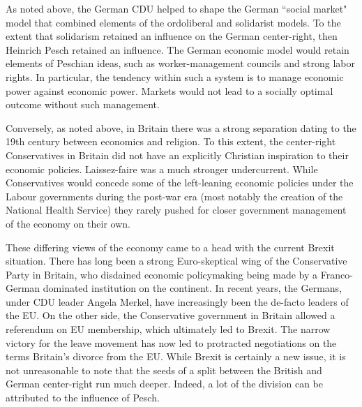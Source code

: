 \documentclass{article}
\begin{document}
As noted above, the German CDU helped to shape the German ``social market" model that combined elements of the ordoliberal and solidarist models.  To the extent that solidarism retained an influence on the German center-right, then Heinrich Pesch retained an influence.  The German economic model would retain elements of Peschian ideas, such as worker-management councils and strong labor rights.  In particular, the tendency within such a system is to manage economic power against economic power.  Markets would not lead to a socially optimal outcome without such management.\medskip

Conversely, as noted above, in Britain there was a strong separation dating to the 19th century between economics and religion.  To this extent, the center-right Conservatives in Britain did not have an explicitly Christian inspiration to their economic policies.  Laissez-faire was a much stronger undercurrent.  While Conservatives would concede some of the left-leaning economic policies under the Labour governments during the post-war era (most notably the creation of the National Health Service) they rarely pushed for closer government management of the economy on their own.\medskip

These differing views of the economy came to a head with the current Brexit situation.  There has long been a strong Euro-skeptical wing of the Conservative Party in Britain, who disdained economic policymaking being made by a Franco-German dominated institution on the continent.  In recent years, the Germans, under CDU leader Angela Merkel, have increasingly been the de-facto leaders of the EU.  On the other side, the Conservative government in Britain allowed a referendum on EU membership, which ultimately led to Brexit.  The narrow victory for the leave movement has now led to protracted negotiations on the terms Britain’s divorce from the EU.  While Brexit is certainly a new issue, it is not unreasonable to note that the seeds of a split between the British and German center-right run much deeper.  Indeed, a lot of the division can be attributed to the influence of Pesch.

\printbibliography
\end{document}
